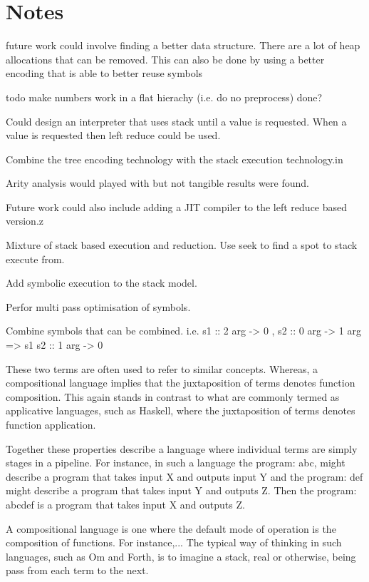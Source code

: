 \chapter{Notes}\label{C:notes}

future work could involve finding a better data structure.
There are a lot of heap allocations that can be removed.
This can also be done by using a better encoding that is able
to better reuse symbols

todo make numbers work in a flat hierachy  (i.e. do no preprocess) done?

Could design an interpreter that uses stack until a value is requested. When a
value is requested then left reduce could be used.

Combine the tree encoding technology with the stack execution technology.in

Arity analysis would played with but not tangible results were found.

Future work could also include adding a JIT compiler to the left reduce based version.z


Mixture of stack based execution and reduction.
Use seek to find a spot to stack execute from.

Add symbolic execution to the stack model.

Perfor multi pass optimisation of symbols.

Combine symbols that can be combined. i.e. s1 :: 2 arg -> 0 , s2 :: 0 arg -> 1 arg => s1 s2 :: 1 arg -> 0



These two terms are often used to refer to similar concepts. Whereas, a compositional language implies that the juxtaposition of terms denotes function composition. This again stands in contrast to what are commonly termed as applicative languages, such as Haskell, where the juxtaposition of terms denotes
function application.

Together these properties describe a language where individual terms are simply stages in a pipeline. For instance, in such a language the program: abc, might describe a program that takes
input X and outputs input Y and the program: def might describe a program that takes input Y and outputs Z. Then the program: abcdef is a program that takes input X and outputs Z.

A compositional language is one where the default mode of operation
is the composition of functions. For instance,...
The typical way of thinking in such languages, such as Om and Forth,
is to imagine a stack, real or otherwise, being pass from each term
to the next.

